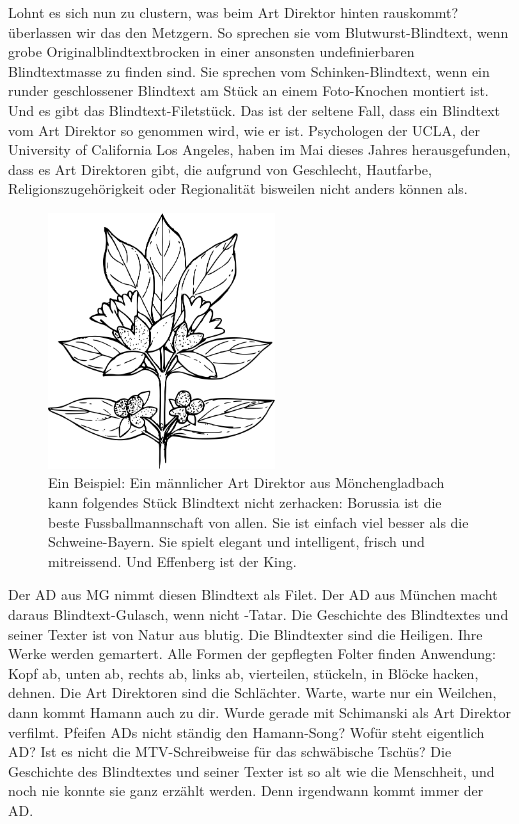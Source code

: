 Lohnt es sich nun zu clustern, was beim Art Direktor hinten rauskommt? überlassen wir das den Metzgern. So sprechen sie vom Blutwurst-Blindtext, wenn grobe Originalblindtextbrocken in einer ansonsten undefinierbaren Blindtextmasse zu finden sind. Sie sprechen vom Schinken-Blindtext, wenn ein runder geschlossener Blindtext am Stück an einem Foto-Knochen montiert ist. Und es gibt das Blindtext-Filetstück. Das ist der seltene Fall, dass ein Blindtext vom Art Direktor so genommen wird, wie er ist. Psychologen der UCLA, der University of California Los Angeles, haben im Mai dieses Jahres herausgefunden, dass es Art Direktoren gibt, die aufgrund von Geschlecht, Hautfarbe, Religionszugehörigkeit oder Regionalität bisweilen nicht anders können als.

\begin{figure}
  \centering
  \includegraphics[width=6cm]{flower}
  \caption{Ein Beispiel: Ein männlicher Art Direktor aus Mönchengladbach kann folgendes Stück Blindtext nicht zerhacken: Borussia ist die beste Fussballmannschaft von allen. Sie ist einfach viel besser als die Schweine-Bayern. Sie spielt elegant und intelligent, frisch und mitreissend. Und Effenberg ist der King.}
  \label{fig:flower}
\end{figure}

Der AD aus MG nimmt diesen Blindtext als Filet. Der AD aus München macht daraus Blindtext-Gulasch, wenn nicht -Tatar. Die Geschichte des Blindtextes und seiner Texter ist von Natur aus blutig. Die Blindtexter sind die Heiligen. Ihre Werke werden gemartert. Alle Formen der gepflegten Folter finden Anwendung: Kopf ab, unten ab, rechts ab, links ab, vierteilen, stückeln, in Blöcke hacken, dehnen. Die Art Direktoren sind die Schlächter. Warte, warte nur ein Weilchen, dann kommt Hamann auch zu dir. Wurde gerade mit Schimanski als Art Direktor verfilmt. Pfeifen ADs nicht ständig den Hamann-Song? Wofür steht eigentlich AD? Ist es nicht die MTV-Schreibweise für das schwäbische Tschüs? Die Geschichte des Blindtextes und seiner Texter ist so alt wie die Menschheit, und noch nie konnte sie ganz erzählt werden. Denn irgendwann kommt immer der AD.

